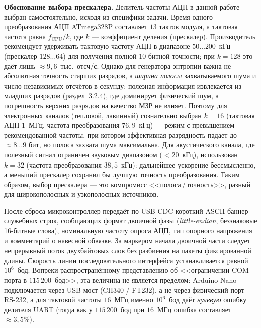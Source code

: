 \textbf{Обоснование выбора прескалера.} Делитель частоты АЦП в данной работе
выбран самостоятельно, исходя из специфики задачи. Время одного преобразования
АЦП ATmega328P составляет $13$ тактов модуля, а тактовая частота равна
$f_\mathrm{CPU}/k$, где $k$ --- коэффициент деления (прескалер). Производитель
рекомендует удерживать тактовую частоту АЦП в диапазоне $50\ldots200$~кГц
(прескалер $128\ldots64$) для получения полной $10$-битной точности; при
$k=128$ это даёт лишь ${\approx}9{,}6$~тыс.\ отсч/с. Однако для генератора
энтропии важна не абсолютная точность старших разрядов, а \emph{ширина полосы}
захватываемого шума и число независимых отсчётов в секунду: полезная информация
извлекается из младших разрядов (раздел~3.2.4), где доминирует физический шум, а
погрешность верхних разрядов на качество МЗР не влияет. Поэтому для электронных
каналов (тепловой, лавинный) сознательно выбран $k=16$ (тактовая АЦП $1$~МГц,
частота преобразования $76{,}9$~кГц) --- режим с превышением рекомендованной
частоты, при котором эффективная разрядность падает до ${\approx}8\ldots9$ бит,
но полоса захвата шума максимальна. Для акустического канала, где полезный сигнал
ограничен звуковым диапазоном (${<}20$~кГц), использован $k=32$ (частота
преобразования $38{,}5$~кГц): дальнейшее ускорение бессмысленно, а меньший
прескалер сохранил бы лучшую точность преобразования. Таким образом, выбор
прескалера --- это компромисс <<полоса\,/\,точность>>, разный для широкополосных
и узкополосных источников.


После сброса микроконтроллер передаёт по USB-CDC короткий ASCII-баннер служебных строк,
сообщающих формат двоичной фазы (\textit{little-endian}, беззнаковые 16-битные слова),
номинальную частоту опроса АЦП, тип опорного напряжения и комментарий о навесной обвязке.
За маркером начала двоичной части следует непрерывный поток двухбайтовых слов без
разбиения на пакеты фиксированной длины. Скорость линии последовательного интерфейса
устанавливается равной $10^6$~бод. Вопреки распространённому представлению об
<<ограничении COM-порта в $115\,200$~бод>>, эта величина не является пределом:
Arduino Nano подключается через USB-мост (CH340 / FT232), а не через физический порт
RS-232, а для тактовой частоты $16$~МГц именно $10^6$~бод даёт \emph{нулевую} ошибку
делителя UART (тогда как у $115\,200$~бод при $16$~МГц ошибка составляет ${\approx}3{,}5\%$).

